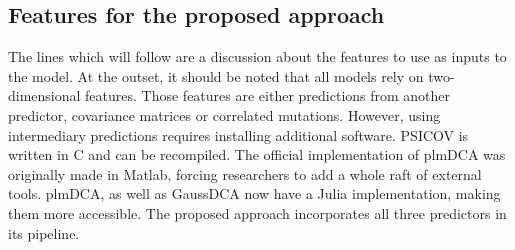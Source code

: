     \subsection{Features for the proposed approach}

        The lines which will follow are a discussion about the features to use as inputs
        to the model. At the outset, it should be noted that all models rely on
        two-dimensional features. Those features are either predictions from another
        predictor, covariance matrices or correlated mutations.
        However, using intermediary predictions requires installing additional software.
        PSICOV is written in C and can be recompiled. The official implementation of
        plmDCA was originally made in Matlab, forcing researchers to add a whole raft
        of external tools. plmDCA, as well as GaussDCA now have a Julia implementation,
        making them more accessible. The proposed approach incorporates all three
        predictors in its pipeline.

